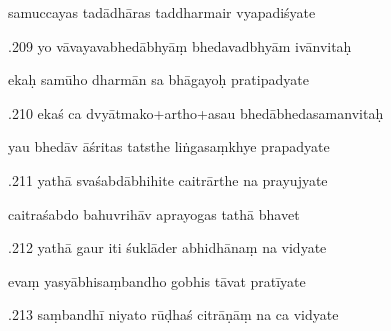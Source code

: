 \documentclass[article,12pt,a4paper]{memoir}%
\newcounter{parCount}
\begin{document}
	  
	  \pstart \leavevmode%
	samuccayas tadādhāras taddharmair vyapadiśyate 
	{}
	\pend%
      

	  
	  \pstart {}.209 yo vāvayavabhedābhyāṃ bhedavadbhyām ivānvitaḥ 
	{}
	\pend%
      

	  
	  \pstart \leavevmode%
	ekaḥ samūho dharmān sa bhāgayoḥ pratipadyate 
	{}
	\pend%
      

	  
	  \pstart {}.210 ekaś ca dvyātmako+artho+asau   bhedābhedasamanvitaḥ 
	{}
	\pend%
      

	  
	  \pstart \leavevmode%
	yau bhedāv āśritas tatsthe liṅgasaṃkhye prapadyate 
	{}
	\pend%
      

	  
	  \pstart {}.211 yathā svaśabdābhihite caitrārthe na prayujyate 
	{}
	\pend%
      

	  
	  \pstart \leavevmode%
	caitraśabdo bahuvrihāv aprayogas tathā bhavet 
	{}
	\pend%
      

	  
	  \pstart {}.212 yathā gaur iti śuklāder abhidhānaṃ na vidyate 
	{}
	\pend%
      

	  
	  \pstart \leavevmode%
	evaṃ yasyābhisaṃbandho gobhis tāvat pratīyate 
	{}
	\pend%
      

	  
	  \pstart {}.213 saṃbandhī niyato rūḍhaś citrāṇāṃ na ca vidyate 
	{}
	\pend%
      
\end{document}

